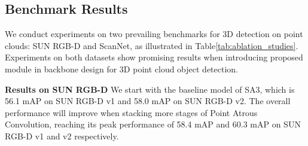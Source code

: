\documentclass[runningheads]{llncs}
\begin{document}
\setlength{\tabcolsep}{4pt}
\begin{table}
\begin{center}
\end{center}
\caption{Comparison of our method with state of the art algorithm on SCanNetV2, evaluated with mAP @0.5}
\label{tab:SCanNet0.5}
\end{table}


\subsection{Benchmark Results}
We conduct experiments on two prevailing benchmarks for 3D detection on point clouds: SUN RGB-D and ScanNet, as illustrated in Table\ref{tab:ablation_studies}. Experiments on both datasets show promising results when introducing proposed module in backbone design for 3D point cloud object detection.

\noindent\textbf{Results on SUN RGB-D}  We start with the baseline model of SA3, which is 56.1 mAP on SUN RGB-D v1 and 58.0 mAP on SUN RGB-D v2. The overall performance will improve when stacking more stages of Point Atrous Convolution, reaching its peak performance of 58.4 mAP and 60.3 mAP on SUN RGB-D v1 and v2 respectively.
\end{document}
